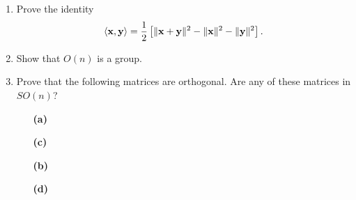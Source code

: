  
{\small
\begin{enumerate}
 
 
 
\bf\item\rm
Prove the identity
\[
\langle {\bold x}, {\bold y} \rangle = \frac{1}{2}
\left[
\|{\bold x} + {\bold y}\|^2 - \|{\bold x}\|^2 - \| {\bold y}\|^2
\right].
\]
 
 
\bf\item\rm
Show that $O(n)$ is a group.
 
 
\bf\item\rm
Prove that the following matrices are orthogonal. Are any of
these matrices in $SO(n)$?
 
\vspace{3pt}        %
 
\hspace{-7pt}
\begin{minipage}[t]{4.6in}
\noindent
\begin{minipage}[t]{2.25in}
\begin{itemize}
 
 \item[{\bf (a)}]

 
 \item[{\bf (c)}]

\end{itemize}
\end{minipage} \hfill
\begin{minipage}[t]{2.25in}
\begin{itemize}
 
 \item[{\bf (b)}]
 
 
 \item[{\bf (d)}]
 

\end{itemize}
\end{minipage}
\end{minipage}
\end{enumerate}}
